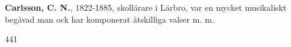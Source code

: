 \textbf{Carlsson, C. N.}, 1822-1885, skollärare i Lärbro, var en mycket musikaliskt begåvad man ock har komponerat
åtskilliga valser m. m.

441 
